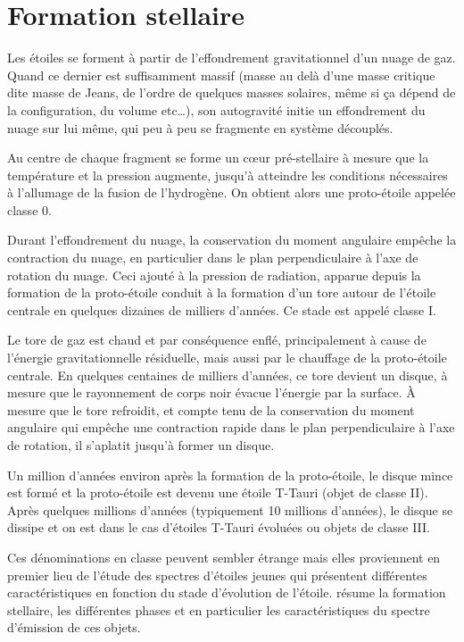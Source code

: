 \section{Formation stellaire}
Les étoiles se forment à partir de l'effondrement gravitationnel d'un nuage de gaz. Quand ce dernier est suffisamment massif (masse au delà d'une masse critique dite masse de Jeans, de l'ordre de quelques masses solaires, même si ça dépend de la configuration, du volume etc\dots), son autogravité initie un effondrement du nuage sur lui même, qui peu à peu se fragmente en système découplés. 

Au centre de chaque fragment se forme un cœur pré-stellaire à mesure que la température et la pression augmente, jusqu'à atteindre les conditions nécessaires à l'allumage de la fusion de l'hydrogène. On obtient alors une proto-étoile appelée \og classe 0\fg. 

Durant l'effondrement du nuage, la conservation du moment angulaire empêche la contraction du nuage, en particulier dans le plan perpendiculaire à l'axe de rotation du nuage. Ceci ajouté à la pression de radiation, apparue depuis la formation de la proto-étoile conduit à la formation d'un tore autour de l'étoile centrale en quelques dizaines de milliers d'années. Ce stade est appelé \og classe I\fg.

Le tore de gaz est chaud et par conséquence enflé, principalement à cause de l'énergie gravitationnelle résiduelle, mais aussi par le chauffage de la proto-étoile centrale.
En quelques centaines de milliers d'années, ce tore devient un disque, à mesure que le rayonnement de corps noir évacue l'énergie par la surface. À mesure que le tore refroidit, et compte tenu de la conservation du moment angulaire qui empêche une contraction rapide dans le plan perpendiculaire à l'axe de rotation, il s'aplatit jusqu'à former un disque. 

Un million d'années environ après la formation de la proto-étoile, le disque mince est formé et la proto-étoile est devenu une étoile T-Tauri (objet de classe II). Après quelques millions d'années (typiquement 10 millions d'années), le disque se dissipe et on est dans le cas d'étoiles T-Tauri évoluées ou objets de classe III. 

Ces dénominations en classe peuvent sembler étrange mais elles proviennent en premier lieu de l'étude des spectres d'étoiles jeunes qui présentent différentes caractéristiques en fonction du stade d'évolution de l'étoile.  résume la formation stellaire, les différentes phases et en particulier les caractéristiques du spectre d'émission de ces objets.
 
